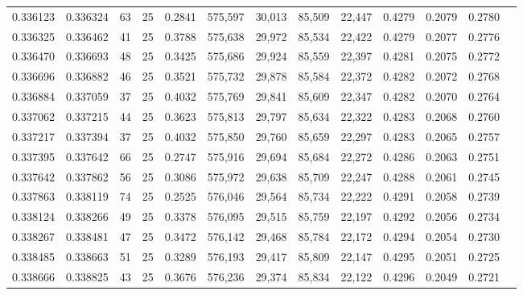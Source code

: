 \begin{tabular}{rrrrrrrrrrrrr}
0.336123 & 0.336324 &    63 &  25 &                                     0.2841 & 575,597 &  30,013 &  85,509 &  22,447 & 0.4279 & 0.2079 & 0.2780 \\
0.336325 & 0.336462 &    41 &  25 &                                     0.3788 & 575,638 &  29,972 &  85,534 &  22,422 & 0.4279 & 0.2077 & 0.2776 \\
0.336470 & 0.336693 &    48 &  25 &                                     0.3425 & 575,686 &  29,924 &  85,559 &  22,397 & 0.4281 & 0.2075 & 0.2772 \\
0.336696 & 0.336882 &    46 &  25 &                                     0.3521 & 575,732 &  29,878 &  85,584 &  22,372 & 0.4282 & 0.2072 & 0.2768 \\
0.336884 & 0.337059 &    37 &  25 &                                     0.4032 & 575,769 &  29,841 &  85,609 &  22,347 & 0.4282 & 0.2070 & 0.2764 \\
0.337062 & 0.337215 &    44 &  25 &                                     0.3623 & 575,813 &  29,797 &  85,634 &  22,322 & 0.4283 & 0.2068 & 0.2760 \\
0.337217 & 0.337394 &    37 &  25 &                                     0.4032 & 575,850 &  29,760 &  85,659 &  22,297 & 0.4283 & 0.2065 & 0.2757 \\
0.337395 & 0.337642 &    66 &  25 &                                     0.2747 & 575,916 &  29,694 &  85,684 &  22,272 & 0.4286 & 0.2063 & 0.2751 \\
0.337642 & 0.337862 &    56 &  25 &                                     0.3086 & 575,972 &  29,638 &  85,709 &  22,247 & 0.4288 & 0.2061 & 0.2745 \\
0.337863 & 0.338119 &    74 &  25 &                                     0.2525 & 576,046 &  29,564 &  85,734 &  22,222 & 0.4291 & 0.2058 & 0.2739 \\
0.338124 & 0.338266 &    49 &  25 &                                     0.3378 & 576,095 &  29,515 &  85,759 &  22,197 & 0.4292 & 0.2056 & 0.2734 \\
0.338267 & 0.338481 &    47 &  25 &                                     0.3472 & 576,142 &  29,468 &  85,784 &  22,172 & 0.4294 & 0.2054 & 0.2730 \\
0.338485 & 0.338663 &    51 &  25 &                                     0.3289 & 576,193 &  29,417 &  85,809 &  22,147 & 0.4295 & 0.2051 & 0.2725 \\
0.338666 & 0.338825 &    43 &  25 &                                     0.3676 & 576,236 &  29,374 &  85,834 &  22,122 & 0.4296 & 0.2049 & 0.2721 \\

\end{tabular}
